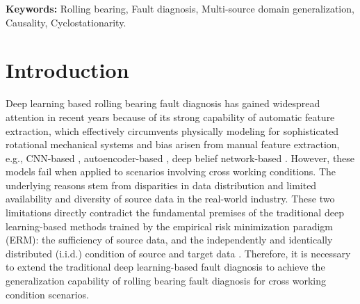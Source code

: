 \documentclass{article}
\newcommand{\keywords}[1]{{\fontsize{8}{10}\selectfont
		\raggedright {\bfseries Keywords:} #1}
}
\begin{document}
	\keywords{Rolling bearing, Fault diagnosis, Multi-source domain generalization, Causality, Cyclostationarity.}
	
	\section{Introduction}
	Deep learning based rolling bearing fault diagnosis has gained widespread attention in recent years because of its strong capability of automatic feature extraction, which effectively circumvents physically modeling for sophisticated rotational mechanical systems and bias arisen from manual feature extraction, e.g., CNN-based \cite{RN20}, autoencoder-based \cite{RN21}, deep belief network-based \cite{RN22}. However, these models fail when applied to scenarios involving cross working conditions. The underlying reasons stem from disparities in data distribution and limited availability and diversity of source data in the real-world industry. These two limitations directly contradict the fundamental premises of the traditional deep learning-based methods trained by the empirical risk minimization paradigm (ERM): the sufficiency of source data, and the independently and identically distributed (i.i.d.) condition of source and target data \cite{RN12}. Therefore, it is necessary to extend the traditional deep learning-based fault diagnosis to achieve the generalization capability of rolling bearing fault diagnosis for cross working condition scenarios.
	
\end{document}
